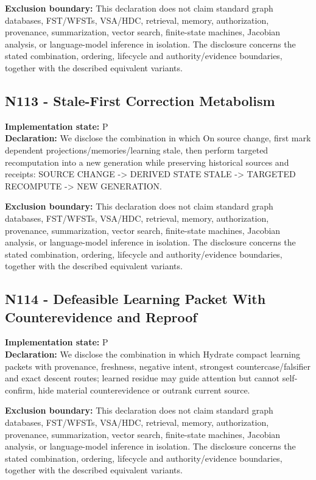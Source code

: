 \documentclass[
  10pt,
  letterpaper,
]{article}
\begin{document}
\textbf{Exclusion boundary:} This declaration does not claim standard
graph databases, FST/WFSTs, VSA/HDC, retrieval, memory, authorization,
provenance, summarization, vector search, finite-state machines,
Jacobian analysis, or language-model inference in isolation. The
disclosure concerns the stated combination, ordering, lifecycle and
authority/evidence boundaries, together with the described equivalent
variants.

\subsection{N113 - Stale-First Correction
Metabolism}\label{n113---stale-first-correction-metabolism}

\textbf{Implementation state:} P\\
\textbf{Declaration:} We disclose the combination in which On source
change, first mark dependent projections/memories/learning stale, then
perform targeted recomputation into a new generation while preserving
historical sources and receipts: SOURCE CHANGE -\textgreater{} DERIVED
STATE STALE -\textgreater{} TARGETED RECOMPUTE -\textgreater{} NEW
GENERATION.

\textbf{Exclusion boundary:} This declaration does not claim standard
graph databases, FST/WFSTs, VSA/HDC, retrieval, memory, authorization,
provenance, summarization, vector search, finite-state machines,
Jacobian analysis, or language-model inference in isolation. The
disclosure concerns the stated combination, ordering, lifecycle and
authority/evidence boundaries, together with the described equivalent
variants.

\subsection{N114 - Defeasible Learning Packet With Counterevidence and
Reproof}\label{n114---defeasible-learning-packet-with-counterevidence-and-reproof}

\textbf{Implementation state:} P\\
\textbf{Declaration:} We disclose the combination in which Hydrate
compact learning packets with provenance, freshness, negative intent,
strongest countercase/falsifier and exact descent routes; learned
residue may guide attention but cannot self-confirm, hide material
counterevidence or outrank current source.

\textbf{Exclusion boundary:} This declaration does not claim standard
graph databases, FST/WFSTs, VSA/HDC, retrieval, memory, authorization,
provenance, summarization, vector search, finite-state machines,
Jacobian analysis, or language-model inference in isolation. The
disclosure concerns the stated combination, ordering, lifecycle and
authority/evidence boundaries, together with the described equivalent
variants.
\end{document}
